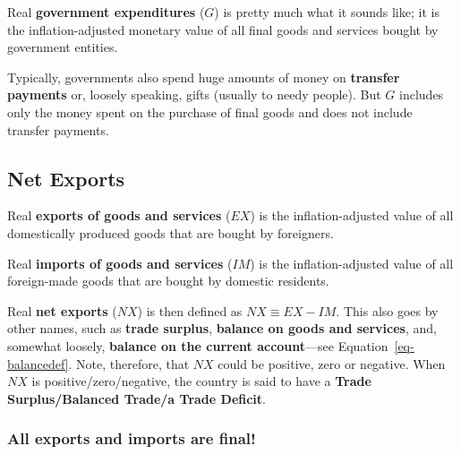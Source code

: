\documentclass[
  letterpaper,
]{book}
\theoremstyle{plain}
\theoremstyle{remark}
\begin{document}

Real \textbf{government expenditures} (\(G\)) is pretty much what it
sounds like; it is the inflation-adjusted monetary value of all final
goods and services bought by government entities.

Typically, governments also spend huge amounts of money on
\textbf{transfer payments} or, loosely speaking, gifts (usually to needy
people). But \(G\) includes only the money spent on the purchase of
final goods and does not include transfer payments.

\subsection{Net Exports}\label{sec-netexports-nia}


Real \textbf{exports of goods and services} (\(EX\)) is the
inflation-adjusted value of all domestically produced goods that are
bought by foreigners.

Real \textbf{imports of goods and services} (\(IM\)) is the
inflation-adjusted value of all foreign-made goods that are bought by
domestic residents.

Real \textbf{net exports} (\(NX\)) is then defined as
\(NX\equiv EX-IM\). This also goes by other names, such as \textbf{trade
surplus}, \textbf{balance on goods and services}, and, somewhat loosely,
\textbf{balance on the current account}---see
Equation~\ref{eq-balancedef}.
Note, therefore, that \(NX\) could be positive, zero or negative. When
\(NX\) is positive/zero/negative, the country is said to have a
\textbf{Trade Surplus/Balanced Trade/a Trade Deficit}.

\subsubsection{All exports and imports are
final!}\label{sec-exp-imp-final}
\end{document}
